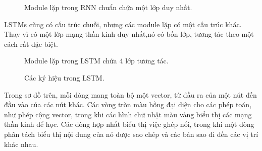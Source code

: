 \begin{figure}[!htb]
    \caption{\label{fig:lstm3-simpleRNN} Module lặp trong RNN chuẩn chứa một lớp duy nhất.}
\end{figure}

LSTMs cũng có cấu trúc chuỗi, nhưng các module lặp có một cấu trúc khác. Thay vì có một lớp
mạng thần kinh duy nhất,nó có bốn lớp, tương tác theo một cách rất đặc biệt.

\begin{figure}[!htb]
    \caption{\label{fig:lstm3-chain} Module lặp trong LSTM chứa 4 lớp tương tác.}
\end{figure}

\begin{figure}[!htb]
    \caption{\label{fig:lstm2-notation} Các ký hiệu trong LSTM.}
\end{figure}

Trong sơ đồ trên, mỗi dòng mang toàn bộ một vector, từ đầu ra của một nút đến đầu vào của các nút khác. Các vòng tròn
màu hồng đại diện cho các phép toán, như phép cộng vector, trong khi các hình chữ nhật màu vàng biểu thị các mạng
thần kinh để học. Các dòng hợp nhất biểu thị việc ghép nối, trong khi một dòng phân tách biểu thị nội dung của nó được
sao chép và các bản sao đi đến các vị trí khác nhau.

